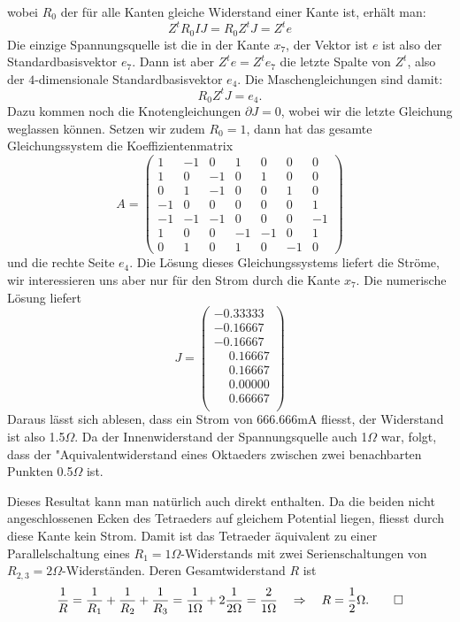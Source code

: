 \begin{loesung}
wobei $R_0$ der für alle Kanten gleiche Widerstand einer Kante ist,
erhält man:
\[
Z^tR_0IJ=R_0Z^tJ=Z^te
\]
Die einzige Spannungsquelle ist die in der Kante $x_7$, der Vektor
ist $e$ ist also der Standardbasisvektor $e_7$. Dann ist aber
$Z^te=Z^te_7$ die letzte Spalte von $Z^t$, also der $4$-dimensionale
Standardbasisvektor $e_4$. Die Maschengleichungen sind damit:
\[
R_0Z^tJ=e_4.
\]
Dazu kommen noch die Knotengleichungen $\partial J=0$, wobei wir die letzte
Gleichung weglassen können. Setzen wir zudem $R_0=1$, dann hat das
gesamte Gleichungssystem die Koeffizientenmatrix
\[
A=\begin{pmatrix}
 1&-1& 0& 1& 0& 0& 0\\
 1& 0&-1& 0& 1& 0& 0\\
 0& 1&-1& 0& 0& 1& 0\\
-1& 0& 0& 0& 0& 0& 1\\
-1&-1&-1& 0& 0& 0&-1\\
 1& 0& 0&-1&-1& 0& 1\\
 0& 1& 0& 1& 0&-1& 0
\end{pmatrix}
\]
%
%
und die rechte Seite $e_4$. Die Lösung dieses Gleichungssystems liefert die
Ströme, wir interessieren uns aber nur für den Strom durch die
Kante $x_7$. Die numerische Lösung liefert
\[
J=\begin{pmatrix}
          -0.33333\\
          -0.16667\\
          -0.16667\\
\phantom{-}0.16667\\
\phantom{-}0.16667\\
\phantom{-}0.00000\\
\phantom{-}0.66667\\
\end{pmatrix}
\]
Daraus lässt sich ablesen, dass ein Strom von 666.666mA fliesst,
der Widerstand ist also 1.5$\Omega$. Da der Innenwiderstand
der Spannungsquelle auch 1$\Omega$ war, folgt, dass der "Aquivalentwiderstand
eines Oktaeders zwischen zwei benachbarten Punkten 0.5$\Omega$ ist.

Dieses Resultat kann man natürlich auch direkt enthalten. Da die beiden
nicht angeschlossenen Ecken des Tetraeders auf gleichem Potential liegen,
fliesst durch diese Kante kein Strom. Damit ist das Tetraeder äquivalent
zu einer Parallelschaltung eines $R_1=1\Omega$-Widerstands mit zwei
Serienschaltungen von $R_{2,3}=2\Omega$-Widerständen.
Deren Gesamtwiderstand $R$
ist
\[
\frac1R=\frac1{R_1}+\frac1{R_2}+\frac1{R_3}=\frac1{1\Omega}+2\frac1{2\Omega}=\frac2{1\Omega}
\quad
\Rightarrow
\quad
R=\frac12\Omega.
\qedhere
\]
\end{loesung}

